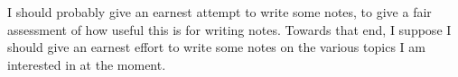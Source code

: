 \begin{node}\label{amn-0001}
I should probably give an earnest attempt to write some notes, to give a
fair assessment of how useful this is for writing notes. Towards that
end, I suppose I should give an earnest effort to write some notes on
the various topics I am interested in at the moment.
\end{node}
